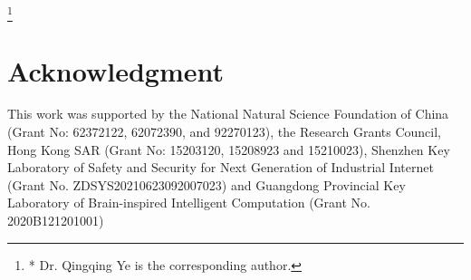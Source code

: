 \documentclass[11pt]{article}
\newcommand\blfootnote[1]{%
	\begingroup
	\renewcommand\thefootnote{}\footnote{#1}%
	\addtocounter{footnote}{-1}%
	\endgroup
}
\begin{document}



\vspace{-1em}
\blfootnote{* Dr. Qingqing Ye is the corresponding author.}







\section*{Acknowledgment}
This work was supported by the National Natural Science Foundation of China (Grant No: 62372122, 62072390, and 92270123), the Research Grants Council, Hong Kong SAR (Grant No: 15203120, 15208923 and 15210023),  Shenzhen Key Laboratory of Safety and Security for Next Generation of Industrial Internet\\  (Grant No. ZDSYS20210623092007023) and Guangdong Provincial Key Laboratory of Brain-inspired Intelligent Computation (Grant No. 2020B121201001)



%
%












%
%
%
\end{document}
